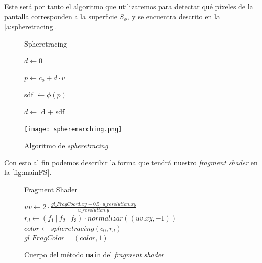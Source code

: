 Este será por tanto el algoritmo que utilizaremos para detectar qué píxeles de la pantalla corresponden a la superficie $S_{\phi}$, y se encuentra descrito en la \autoref{a:spheretracing}. 
\begin{figure}[ht!]
    \centering
    \begin{minipage}{0.50\textwidth}
       \begin{algorithm}[H]
            \caption{Spheretracing}
                $d \gets 0$ 
                
                 {
                    $p \gets c_o + d \cdot v$
                    
                    sdf $\gets \phi(p)$
                    
            
                    $d \gets$ d + sdf
            
                }
        \end{algorithm}
    \end{minipage}%
    \hfill
    \begin{minipage}{0.48\textwidth}
        \texttt{[image: spheremarching.png]}
    \end{minipage}
    \caption{Algoritmo de \textit{spheretracing}}
    \label{a:spheretracing}
\end{figure}

Con esto al fin podemos describir la forma que tendrá nuestro \textit{fragment shader} en la \autoref{fig:mainFS}.
\begin{figure}[ht!]
    \centering
    
       \begin{algorithm}[H]
            \caption{Fragment Shader}
            
                $uv \gets 2\cdot \frac{gl\_FragCoord.xy- 0.5\cdot u\_resolution.xy}{u\_resolution.y}$\\[8pt]

                $r_d \gets (f_1\ \vert \ f_2\ \vert \ f_3)\cdot normalizar((uv.xy,-1))$\\[5pt]

                $color \gets spheretracing(c_0, r_d)$\\[5pt]

                $gl\_FragColor = (color, 1)$
        \end{algorithm}
    \caption{Cuerpo del método \texttt{main} del \textit{fragment shader}}
    \label{fig:mainFS}
\end{figure}

